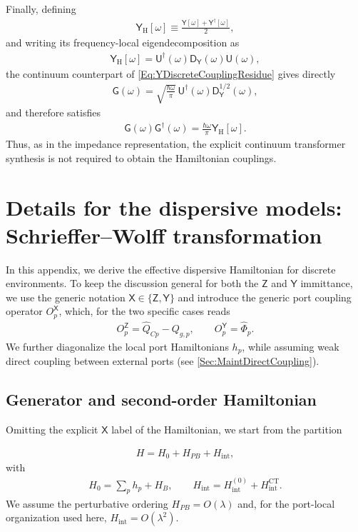 \documentclass[prx,aps,twocolumn,article]{revtex4-2}
\newcommand{\msf}[1]{\mathsf{#1}}
\newcommand{\msY}{\msf{Y}}
\newcommand{\msZ}{\msf{Z}}
\newcommand{\msYH}{\msY_\mathrm{H}}
\newcommand{\msG}{\msf{G}}
\newcommand{\msD}{\msf{D}}
\newcommand{\msU}{\msf{U}}
\newcommand{\msX}{\msf{X}}
\begin{document}
Finally, defining
\begin{align}
    \msYH[\omega]
    \equiv
    \frac{
        \msY[\omega]
        +
        \msY^\dag[\omega]
    }{2},
\end{align}
and writing its frequency-local eigendecomposition as
\begin{align}
    \msYH[\omega]
    =
    \msU^\dag(\omega)
    \msD_{\msY}(\omega)
    \msU(\omega),
\end{align}
the continuum counterpart of \cref{Eq:YDiscreteCouplingResidue} gives
directly
\begin{align}
    \msG(\omega)
    =
    \sqrt{
        \frac{\hbar\omega}{\pi}
    }\,
    \msU^\dag(\omega)
    \msD_{\msY}^{1/2}(\omega),
\end{align}
and therefore satisfies
\begin{align}
    \msG(\omega)
    \msG^\dag(\omega)
    =
    \frac{\hbar\omega}{\pi}
    \msYH[\omega].
    \label{Eq:YCouplingSpectralIdentities}
\end{align}
Thus, as in the impedance representation, the explicit continuum
transformer synthesis is not required to obtain the Hamiltonian
couplings.

\section{Details for the dispersive models: Schrieffer--Wolff transformation}
\label{Sec:AppendixDiscreteSW}
In this appendix, we derive the effective dispersive Hamiltonian for discrete environments. To keep the discussion general for both the $\msZ$ and $\msY$ immittance, we use the generic notation $\msX\in\{\msZ,\msY\}$ and introduce the generic port coupling operator $O_p^\msX$, which, for the two specific cases reads
\begin{align}
    O_{p}^{\msZ}=\hat Q_{Cp}-Q_{g,p},
    \qquad
    O_{p}^{\msY}=\hat\Phi_p.
\end{align}
We further diagonalize the local port Hamiltonians $h_p$, while assuming weak direct coupling between external ports (see \cref{Sec:MaintDirectCoupling}).

\subsection{Generator and second-order Hamiltonian}
Omitting the explicit $\msX$ label of the Hamiltonian, we start from the partition

\begin{align}
    H
    =
    H_0
    +
    H_{PB}
    +
    H_{\mathrm{int}},
\label{Eq:AppendixSWStartingHamiltonian}
\end{align}
with
\begin{align}
    H_0=\sum_p h_p+H_B,
    \qquad
    H_{\mathrm{int}}
    =
    H_{\mathrm{int}}^{(0)}
    +
    H_{\mathrm{int}}^{\mathrm{CT}}.
\end{align}
We assume the perturbative ordering $H_{PB}=O(\lambda)$ and, for the port-local organization used here,
$H_{\mathrm{int}}=O(\lambda^2)$.
\end{document}
